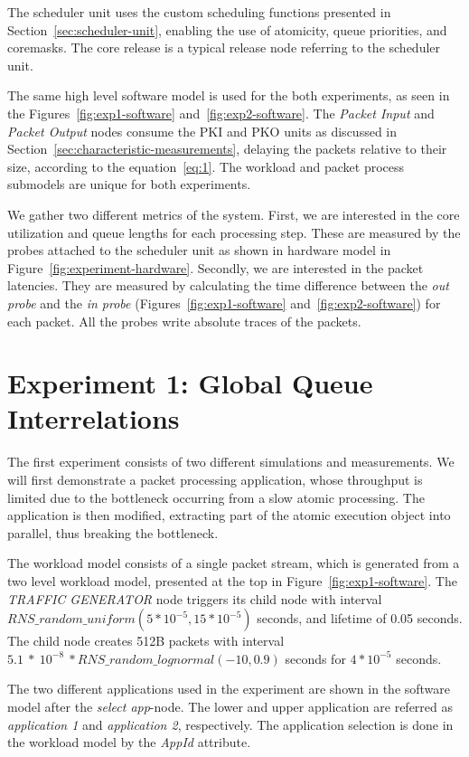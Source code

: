 The scheduler unit uses the custom scheduling functions presented in Section~\ref{sec:scheduler-unit}, enabling the use of atomicity, queue priorities, and coremasks. The core release is a typical release node referring to the scheduler unit.

The same high level software model is used for the both experiments, as seen in the Figures~\ref{fig:exp1-software} and~\ref{fig:exp2-software}. The \emph{Packet Input} and \emph{Packet Output} nodes consume the PKI and PKO units as discussed in Section~\ref{sec:characteristic-measurements}, delaying the packets relative to their size, according to the equation~\ref{eq:1}. The workload and packet process submodels are unique for both experiments.

We gather two different metrics of the system. First, we are interested in the core utilization and queue lengths for each processing step. These are measured by the probes attached to the scheduler unit as shown in hardware model in Figure~\ref{fig:experiment-hardware}. Secondly, we are interested in the packet latencies. They are measured by calculating the time difference between the \emph{out probe} and the \emph{in probe} (Figures~\ref{fig:exp1-software} and~\ref{fig:exp2-software}) for each packet. All the probes write absolute traces of the packets.

\section{Experiment 1: Global Queue Interrelations}
The first experiment consists of two different simulations and measurements. We will first demonstrate a packet processing application, whose throughput is limited due to the bottleneck occurring from a slow atomic processing. The application is then modified, extracting part of the atomic execution object into parallel, thus breaking the bottleneck.

The workload model consists of a single packet stream, which is generated from a two level workload model, presented at the top in Figure~\ref{fig:exp1-software}. The \emph{TRAFFIC GENERATOR} node triggers its child node with interval $RNS\_random\_uniform(5*10^{-5}, 15*10^{-5})$ seconds, and lifetime of 0.05 seconds. The child node creates 512B packets with interval $5.1~*~10^{-8}~* RNS\_random\_lognormal(-10, 0.9)$ seconds for $4*10^{-5}$ seconds.

The two different applications used in the experiment are shown in the software model after the \emph{select app}-node. The lower and upper application are referred as \emph{application 1} and \emph{application 2}, respectively. The application selection is done in the workload model by the \emph{AppId} attribute.

